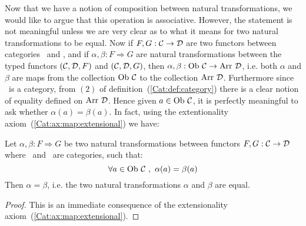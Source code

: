 Now that we have a notion of composition between natural transformations,
we would like to argue that this operation is associative. However, the 
statement is not meaningful unless we are very clear as to what it means
for two natural transformations to be equal. Now if $F,G:\mbox{$\cal C$}\to\mbox{$\cal D$}$ are
two functors between categories \Cat\ and \Dat, and if 
$\alpha,\beta:F\Rightarrow G$ are natural transformations between the 
typed functors $(\mbox{$\cal C$},\mbox{$\cal D$},F)$ and $(\mbox{$\cal C$},\mbox{$\cal D$},G)$, then
$\alpha,\beta:\mbox{\rm Ob}\ \mbox{$\cal C$}\to\mbox{\rm Arr}\ \mbox{$\cal D$}$, i.e. both $\alpha$ and $\beta$
are maps from the collection $\ob\ \Cat$ to the collection $\arr\ \Dat$.
Furthermore since \Dat\ is a category, from $(2)$ of 
definition~(\ref{Cat:def:category}) there is a clear notion of equality 
defined on $\arr\ \Dat$. Hence given $a\in\ob\ \Cat$, it is perfectly 
meaningful to ask whether $\alpha(a)=\beta(a)$. In fact, using the
extentionality axiom~(\ref{Cat:ax:map:extensional}) we have: 
\begin{prop}\label{Nat:prop:equal}
    Let $\alpha,\beta:F\Rightarrow G$ be two natural transformations between
    functors $F,G:\mbox{$\cal C$}\to\mbox{$\cal D$}$ where \Cat\ and \Dat\ are categories, such that:
        \[
            \forall a\in\ob\ \Cat\ ,\ \alpha(a)=\beta(a)
        \]
    Then $\alpha=\beta$, i.e. the two natural transformations $\alpha$
    and $\beta$ are equal.
\end{prop}
\begin{proof}
    This is an immediate consequence of the extensionality 
    axiom~(\ref{Cat:ax:map:extensional}).
\end{proof}

